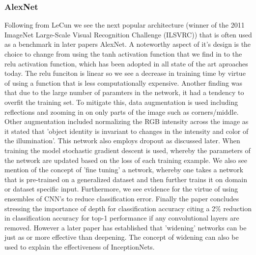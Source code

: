   \subsubsection{AlexNet}
    Following from LeCun we see the next popular architecture (winner of the 2011 ImageNet Large-Scale Visual Recognition Challenge (ILSVRC)) that is often used as a benchmark in later papers AlexNet\cite{Krizhevsky}. A noteworthy aspect of it's design is the choice to change from using the tanh activation function that we find in \cite{leCun1998} to the relu activation function, which has been adopted in all state of the art aproaches today. The relu funciton is linear so we see a decrease in training time by virtue of using a function that is less computationally expensive. Another finding was that due to the large number of paramters in the network, it had a tendency to overfit the training set. To mitigate this, data augmentation is used including reflections and zooming in on only parts of the image such as corners/middle. Other augmentation included normalizing the RGB intensity across the image as it stated that 'object identity is invariant to changes in the intensity and color of the illumination'. This network also employs dropout as discussed later. When training the model stochastic gradient descent is used, whereby the parameters of the network are updated based on the loss of each training example. We also see mention of the concept of 'fine tuning' a network, whereby one takes a network that is pre-trained on a generalized dataset and then further trains it on domain or dataset specific input. Furthermore, we see evidence for the virtue of using ensembles of CNN's to reduce classification error. Finally the paper concludes stressing the importance of depth for classification accuracy citing a 2\% reduction in classification accuracy for top-1 performance if any convolutional layers are removed. However a later paper \cite{Zagoruyko} has established that 'widening' networks can be just as or more effective than deepening. The concept of widening can also be used to explain the effectiveness of InceptionNets.
